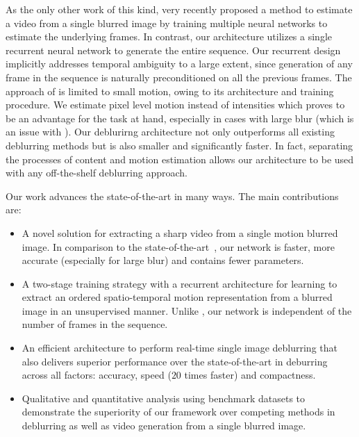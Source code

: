 \documentclass[10pt,twocolumn,letterpaper]{article}
\begin{document}
As the only other work of this kind, \cite{jin2018learning} very recently proposed a method to estimate a video from a single blurred image by training multiple neural networks to estimate the underlying frames. In contrast, our architecture utilizes a single recurrent neural network to generate the entire sequence. Our recurrent design implicitly addresses temporal ambiguity to a large extent, since generation of any frame in the sequence is naturally preconditioned on all the previous frames. The approach of \cite{jin2018learning} is limited to small motion, owing to its architecture and training procedure. We estimate pixel level motion instead of intensities which proves to be an advantage for the task at hand, especially in cases with large blur (which is an issue with \cite{jin2018learning}). Our deblurirng architecture not only outperforms all existing deblurring methods but is also smaller and significantly faster. In fact, separating the processes of content and motion estimation allows our architecture to be used with any off-the-shelf deblurring approach. 



Our work advances the state-of-the-art in many ways. The main contributions are:

\begin{itemize}
\item A novel solution for extracting a sharp video from a single motion blurred image. In comparison to the state-of-the-art~\cite{jin2018learning}, our network is faster, more accurate (especially for large blur) and contains fewer parameters.

\item A two-stage training strategy with a recurrent architecture for learning to extract an ordered spatio-temporal motion representation from a blurred image in an unsupervised manner. Unlike \cite{jin2018learning}, our network is independent of the number of frames in the sequence.

\item An efficient architecture to perform real-time single image deblurring that also delivers superior performance over the state-of-the-art in deburring~\cite{tao2018scale} across all factors: accuracy, speed ($20$ times faster) and compactness.

\item Qualitative and quantitative analysis using benchmark datasets to demonstrate the superiority of our framework over competing methods in deblurring as well as video generation from a single blurred image. 

\end{itemize}
\end{document}
